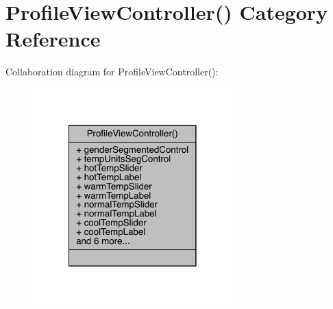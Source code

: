 \hypertarget{category_profile_view_controller_07_08}{\section{Profile\-View\-Controller() Category Reference}
\label{category_profile_view_controller_07_08}
}


Collaboration diagram for Profile\-View\-Controller()\-:\nopagebreak
\begin{figure}[H]
\begin{center}
\leavevmode
\includegraphics[width=218pt]{category_profile_view_controller_07_08__coll__graph}
\end{center}
\end{figure}
